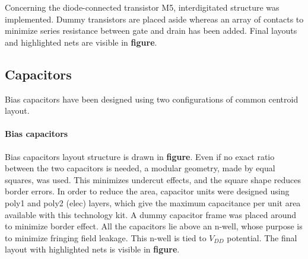 

Concerning the diode-connected transistor M5, interdigitated structure was implemented. Dummy transistors are placed aside whereas an array of contacts to minimize series resistance between gate and drain has been added. Final layouts and highlighted nets are visible in \textbf{figure}. 

\subsection{Capacitors}
Bias capacitors have been designed using two configurations of common centroid layout.
\paragraph{Bias capacitors}
Bias capacitors layout structure is drawn in \textbf{figure}. 
Even if no exact ratio between the two capacitors is needed, a modular geometry, made by equal squares, was used. This minimizes undercut effects, and the square shape reduces border errors. In order to reduce the area, capacitor units were designed using poly1 and poly2 (elec) layers, which give the maximum capacitance per unit area available with this technology kit. A dummy capacitor frame was placed around to minimize border effect. All the capacitors lie above an n-well, whose purpose is to minimize fringing field leakage. This n-well is tied to \(V_{DD}\) potential. The final layout with highlighted nets is visible in \textbf{figure}. 

